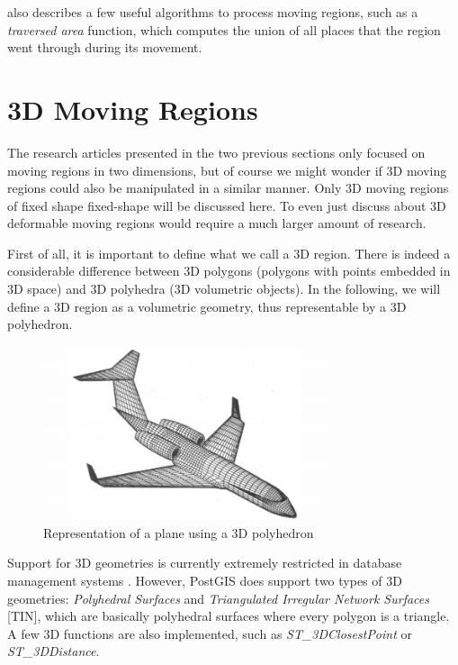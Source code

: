 \cite{fmregion} also describes a few useful algorithms to process moving regions, such as a \textit{traversed area} function, which computes the union of all places that the region went through during its movement.

\section{3D Moving Regions}
\label{section:3d_regions_intro}

The research articles presented in the two previous sections only focused on moving regions in two dimensions, but of course we might wonder if 3D moving regions could also be manipulated in a similar manner. Only 3D moving regions of fixed shape fixed-shape will be discussed here. To even just discuss about 3D deformable moving regions would require a much larger amount of research.

First of all, it is important to define what we call a 3D region. There is indeed a considerable difference between 3D polygons (polygons with points embedded in 3D space) and 3D polyhedra (3D volumetric objects). In the following, we will define a 3D region as a volumetric geometry, thus representable by a 3D polyhedron.

\begin{figure}[h!]
    \centering
    \includegraphics[width=0.75\textwidth]{images/plane_polyhedron.png}
    \caption{Representation of a plane using a 3D polyhedron \cite{3d_polyhedron}}
    \label{fig:polyhedron}
\end{figure}


Support for 3D geometries is currently extremely restricted in database management systems \cite{3d_geom}. However, PostGIS does support two types of 3D geometries: \textit{Polyhedral Surfaces} and \textit{Triangulated Irregular Network Surfaces} [TIN], which are basically polyhedral surfaces where every polygon is a triangle. A few 3D functions are also implemented, such as \textit{ST\_3DClosestPoint} or \textit{ST\_3DDistance}.

